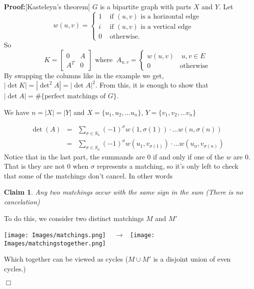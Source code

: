 \documentclass[11pt]{article}
\newtheorem{claim}[theorem]{Claim}
\newenvironment{proof}{\noindent \textbf{Proof:}}{$\Box$}
\begin{document}
\begin{proof}[Kasteleyn's theorem]
$G$ is a bipartite graph with parts $X$ and $Y$. Let
\[
w(u,v)=\begin{cases} 1 & \text{ if } (u,v) \text{ is a horizontal edge} \\ i & \text{ if } (u,v) \text{ is a vertical edge} \\0 & \text{ otherwise.} \end{cases}
\]
 So
\[
K=\left[\begin{array}{c|c}
 0 & A \\ \hline
  A^T& 0
   \end{array}\right]
   \text{ where } \ 
A_{u,v}=\left\{\begin{array}{cc}w(u,v) & \ u,v\in E \\0 & \text{otherwise}\end{array}\right.
\]
By swapping the columns like in the example we get, $|\det K|=|\det^2 A|=|\det A|^2$. From this, it is enough to show that $|\det A|=\#\{\text{perfect matchings of } G\}$.

We have $n=|X|=|Y|$ and $X=\{u_1,u_2, \dots u_n\}$, $Y=\{v_1, v_2, \dots v_n\}$

\begin{eqnarray}
\det(A) 	&=& \sum_{\sigma\in S_n} (-1)^\sigma w(1,\sigma(1))\cdot \dots w(n,\sigma(n))\\
 		&=&\sum_{\sigma\in S_n} (-1)^\sigma w(u_1,v_{\sigma(1)})\cdot \dots w(u_n,v_{\sigma(n)})
\end{eqnarray}
Notice that in the last part, the summands are $0$ if and only if one of the $w$ are $0$. That is they are not $0$ when $\sigma$ represents a matching, so it's only left to check that some of the matchings don't cancel. In other words

\begin{claim}
Any two matchings occur with the same sign in the sum (There is no cancelation)
\end{claim}

To do this, we consider two distinct matchings $M$ and $M'$


    \begin{center}

 	\texttt{[image: Images/matchings.png]}
$ \ \ \ \ \rightarrow \ \ $
 	\texttt{[image: Images/matchingstogether.png]}
	\end{center}

Which together  can be viewed as cycles ($M\cup M' $ is a disjoint union of even cycles.)


\end{proof}
\end{document}
